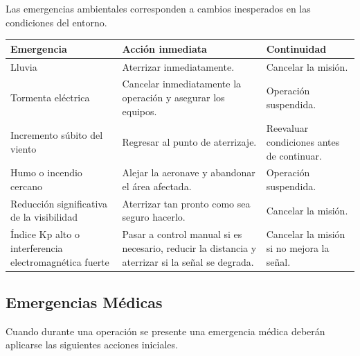 Las emergencias ambientales corresponden a cambios inesperados en las condiciones del entorno.

\renewcommand{\arraystretch}{1.4}

\begin{longtable}{|p{4.5cm}|p{6cm}|p{3.5cm}|}
\hline

\textbf{Emergencia} &
\textbf{Acción inmediata} &
\textbf{Continuidad}

\\ \hline

Lluvia &
Aterrizar inmediatamente. &
Cancelar la misión.

\\ \hline

Tormenta eléctrica &
Cancelar inmediatamente la operación y asegurar los equipos. &
Operación suspendida.

\\ \hline

Incremento súbito del viento &
Regresar al punto de aterrizaje. &
Reevaluar condiciones antes de continuar.

\\ \hline

Humo o incendio cercano &
Alejar la aeronave y abandonar el área afectada. &
Operación suspendida.

\\ \hline

Reducción significativa de la visibilidad &
Aterrizar tan pronto como sea seguro hacerlo. &
Cancelar la misión.

\\ \hline

Índice Kp alto o interferencia electromagnética fuerte &
Pasar a control manual si es necesario, reducir la distancia y aterrizar si la señal se degrada. &
Cancelar la misión si no mejora la señal.

\\ \hline

\end{longtable}

\subsection{Emergencias Médicas}

Cuando durante una operación se presente una emergencia médica deberán aplicarse las siguientes acciones iniciales.

\renewcommand{\arraystretch}{1.4}

